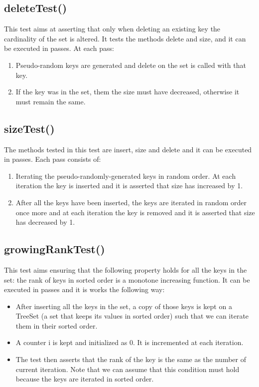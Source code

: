 \subsection{{\ttfamily deleteTest()}}

This test aims at asserting that only when deleting an existing key the cardinality of the set is altered. It tests the methods {\ttfamily delete} and size, and it can be executed in passes. At each pass:
\begin{enumerate}
    \item
    Pseudo-random keys are generated and delete on the set is called with that key.
    \item
    If the key was in the set, them the size must have decreased, otherwise it must remain the same.
\end{enumerate}

\subsection{{\ttfamily sizeTest()}}

The methods tested in this test are {\ttfamily insert}, {\ttfamily size} and {\ttfamily delete} and it can be executed in passes. Each pass consists of:
\begin{enumerate}
    \item
    Iterating the pseudo-randomly-generated keys in random order. At each iteration the key is inserted and it is asserted that {\ttfamily size} has increased by 1.
    \item
    After all the keys have been inserted, the keys are iterated in random order once more and at each iteration the key is removed and it is asserted that {\ttfamily size} has decreased by 1.
\end{enumerate}

\subsection{{\ttfamily growingRankTest()}}

This test aims ensuring that the following property holds for all the keys in the set: the rank of keys in sorted order is a monotone increasing function. It can be executed in passes and it is works the following way:
\begin{itemize}
    \item
    After inserting all the keys in the set, a copy of those keys is kept on a {\ttfamily TreeSet} (a set that keeps its values in sorted order) such that we can iterate them in their sorted order.
    \item
    A counter {\ttfamily i} is kept and initialized as $0$. It is incremented at each iteration.
    \item
    The test then asserts that the rank of the key is the same as the number of current iteration. Note that we can assume that this condition must hold because the keys are iterated in sorted order. 
\end{itemize}

